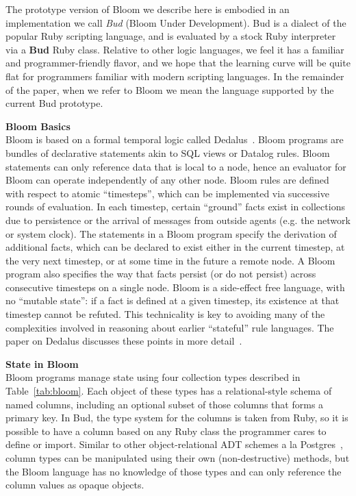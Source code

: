 The prototype version of Bloom we describe here is embodied in an implementation we call {\em Bud} (Bloom Under Development).  Bud is a dialect of the popular Ruby scripting language, and is evaluated by a stock Ruby interpreter via a \textbf{Bud} Ruby class.  Relative to other logic languages, we feel it has a familiar and programmer-friendly flavor, and we hope that the learning curve will be quite flat for programmers familiar with modern scripting languages.
In the remainder of the paper, when we refer to Bloom we mean the language supported by the current Bud prototype.

\noindent\textbf{Bloom Basics}\\
\noindent
Bloom is based on a formal temporal logic called Dedalus~\cite{dedalus-techr}.  Bloom programs are bundles of declarative statements akin to SQL views or Datalog rules.  Bloom statements can only reference data that is local to a node, hence an evaluator for Bloom can operate independently of any other node.  Bloom rules are defined with respect to atomic ``timesteps'', which can be implemented via successive rounds of evaluation. In each timestep, certain ``ground'' facts exist in collections due to persistence or the arrival of messages from outside agents (e.g. the network or system clock).  The statements in a Bloom program specify the derivation of additional facts, which can be declared to exist either in the current timestep, at the very next timestep, or at some time in the future a remote node.  A Bloom program also specifies the way that facts persist (or do not persist) across consecutive timesteps on a single node.  Bloom is a side-effect free language, with no ``mutable state'': if a fact is defined at a given timestep, its existence at that timestep cannot be refuted.  This technicality is key to avoiding many of the complexities involved in reasoning about earlier ``stateful'' rule languages.  The paper on Dedalus discusses these points in more detail~\cite{dedalus-techr}.

\noindent\textbf{State in Bloom}\\
\noindent
Bloom programs manage state using four collection types described in Table~\ref{tab:bloom}. Each object of these types has a relational-style schema of named columns, including an optional subset of those columns that forms a primary key.  In Bud, the type system for the columns is taken from Ruby, so it is possible to have a column based on any Ruby class the programmer cares to define or import.  Similar to other object-relational ADT schemes a la Postgres~\cite{postgres-adt}, column types can be manipulated using their own (non-destructive) methods, but the Bloom language has no knowledge of those types and can only reference the column values as opaque objects.

